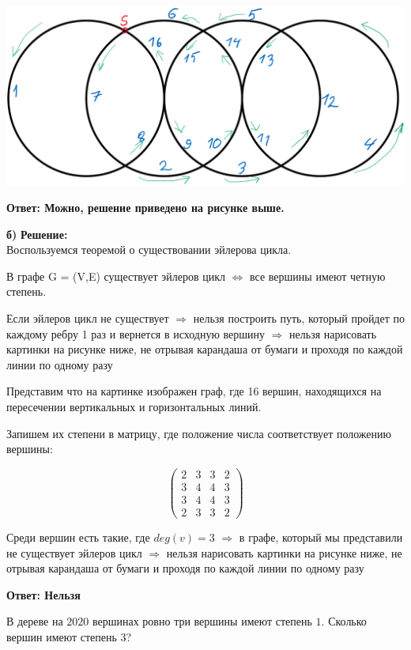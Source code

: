 \documentclass[a4paper,12pt]{article}
\newcounter{z}
\newcommand{\z}{\refstepcounter{z}\vskip 20pt\noindent
\fbox{\textbf{\arabic{z}}} }
\begin{document}
\begin{center}
\includegraphics[width=\textwidth]{img/path.png}
\end{center}


\textbf{Ответ: Можно, решение приведено на рисунке выше.}

{\bf б)} 
\textbf{Решение:} \\
Воспользуемся теоремой о существовании эйлерова цикла.

В графе G = (V,E) существует эйлеров цикл $\Leftrightarrow$ все вершины имеют четную степень.

Если эйлеров цикл не существует $\Rightarrow$ нельзя построить путь, который пройдет по каждому ребру 1 раз и вернется в исходную вершину $\Rightarrow$ нельзя нарисовать картинки на рисунке ниже, не отрывая карандаша от бумаги и проходя по каждой линии по одному разу

Представим что на картинке изображен граф, где 16 вершин, находящихся на пересечении вертикальных и горизонтальных линий.

Запишем их степени в матрицу, где положение числа соответствует положению вершины:

$$\begin{pmatrix}
2 & 3 & 3 & 2\\
3 & 4 & 4 & 3\\
3 & 4 & 4 & 3\\
2 & 3 & 3 & 2
\end{pmatrix}$$

Среди вершин есть такие, где $deg(v) =3$ $\Rightarrow$ в графе, который мы представили не существует эйлеров цикл $\Rightarrow$ нельзя нарисовать картинки на рисунке ниже, не отрывая карандаша от бумаги и проходя по каждой линии по одному разу

\textbf{Ответ: Нельзя}

\z В дереве на $2020$ вершинах ровно три вершины имеют степень $1$.
Сколько вершин имеют степень $3$?
\end{document}
